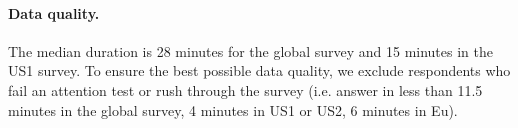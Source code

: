 \begin{small}
\paragraph{\small Data quality.} %
The median duration is 28 minutes for the global survey and 15 minutes in the US1 survey. To ensure the best possible data quality, we exclude respondents who fail an attention test or rush through the survey (i.e. answer in less than 11.5 minutes in the global survey, 4 minutes in US1 or US2, 6 minutes in Eu). %


\end{small}
